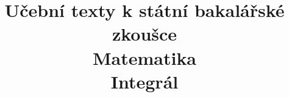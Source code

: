 \clearpage

\clearpage

\title{\LARGE Učební texty k státní bakalářské zkoušce \\ Matematika \\ Integrál}



\maketitle

\newpage
\setcounter{section}{3}



